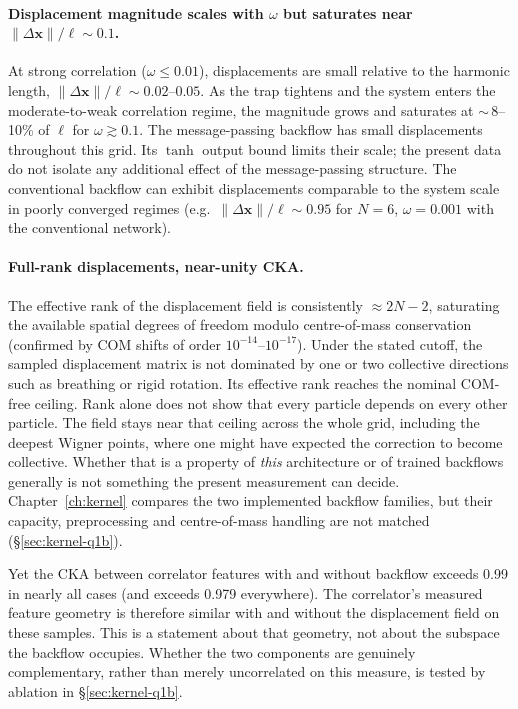 \paragraph{Displacement magnitude scales with $\omega$ but saturates near $\|\Delta\mathbf{x}\|/\ell \sim 0.1$.}
At strong correlation ($\omega \leq 0.01$), displacements are small relative to the harmonic length,
$\|\Delta\mathbf{x}\|/\ell \sim 0.02$--$0.05$.
As the trap tightens and the system enters the moderate-to-weak correlation regime,
the magnitude grows and saturates at $\sim$\,8--10\% of $\ell$ for $\omega \gtrsim 0.1$.
The message-passing backflow has small displacements throughout this grid. Its $\tanh$
output bound limits their scale; the present data do not isolate any additional effect of
the message-passing structure. The conventional backflow can exhibit
displacements comparable to the system scale in poorly converged regimes
(e.g.\ $\|\Delta\mathbf{x}\|/\ell \sim 0.95$ for $N{=}6$, $\omega{=}0.001$ with the conventional network).

\paragraph{Full-rank displacements, near-unity CKA.}
The effective rank of the displacement field is consistently $\approx 2N - 2$,
saturating the available spatial degrees of freedom modulo centre-of-mass conservation
(confirmed by COM shifts of order $10^{-14}$--$10^{-17}$).
Under the stated cutoff, the sampled displacement matrix is not dominated by one or two
collective directions such as breathing or rigid rotation. Its effective rank reaches the
nominal COM-free ceiling. Rank alone does not show that every particle depends on every
other particle.
The field stays near that ceiling across the whole grid, including the deepest Wigner
points, where one might have expected the correction to become collective. Whether that
is a property of \emph{this} architecture or of trained backflows generally is not
something the present measurement can decide. Chapter~\ref{ch:kernel} compares the two
implemented backflow families, but their capacity, preprocessing and centre-of-mass
handling are not matched (\S\ref{sec:kernel-q1b}).

Yet the CKA between correlator features with and without backflow exceeds 0.99 in nearly all cases
(and exceeds 0.979 everywhere).
The correlator's measured feature geometry is therefore similar with and without the
displacement field on these samples. This is a statement about that geometry, not about the subspace the
backflow occupies. Whether the two components are genuinely complementary, rather than
merely uncorrelated on this measure, is tested by ablation in \S\ref{sec:kernel-q1b}.

